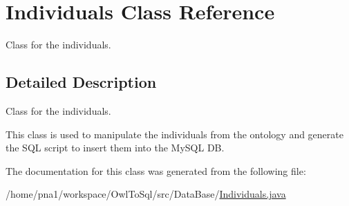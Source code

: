 \hypertarget{class_individuals}{
\section{Individuals Class Reference}
\label{class_individuals}
}


Class for the individuals.  




\subsection{Detailed Description}
Class for the individuals. 

This class is used to manipulate the individuals from the ontology and generate the SQL script to insert them into the MySQL DB. 

The documentation for this class was generated from the following file:\begin{DoxyCompactItemize}
\item 
/home/pna1/workspace/OwlToSql/src/DataBase/\hyperlink{_individuals_8java}{Individuals.java}\end{DoxyCompactItemize}
